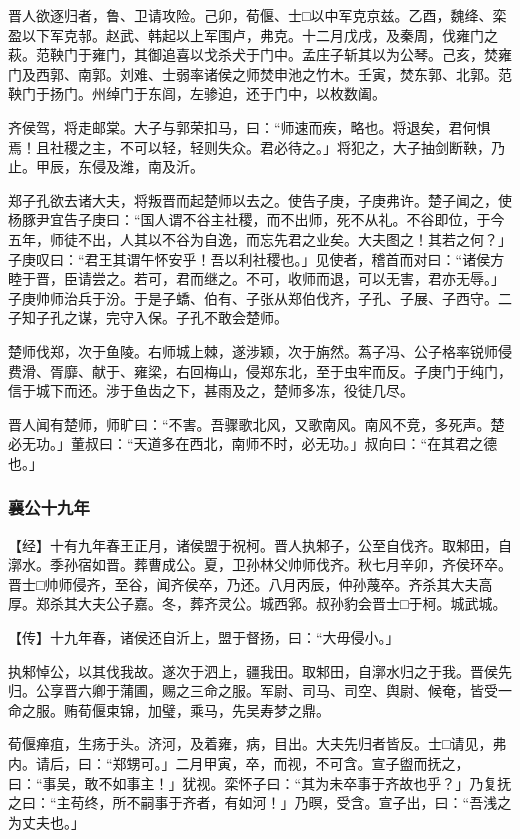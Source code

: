 \documentclass[]{article}
\begin{document}
晋人欲逐归者，鲁、卫请攻险。己卯，荀偃、士□以中军克京兹。乙酉，魏绛、栾盈以下军克邿。赵武、韩起以上军围卢，弗克。十二月戊戌，及秦周，伐雍门之萩。范鞅门于雍门，其御追喜以戈杀犬于门中。孟庄子斩其以为公琴。己亥，焚雍门及西郭、南郭。刘难、士弱率诸侯之师焚申池之竹木。壬寅，焚东郭、北郭。范鞅门于扬门。州绰门于东闾，左骖迫，还于门中，以枚数阖。

齐侯驾，将走邮棠。大子与郭荣扣马，曰：``师速而疾，略也。将退矣，君何惧焉！且社稷之主，不可以轻，轻则失众。君必待之。」将犯之，大子抽剑断鞅，乃止。甲辰，东侵及潍，南及沂。

郑子孔欲去诸大夫，将叛晋而起楚师以去之。使告子庚，子庚弗许。楚子闻之，使杨豚尹宜告子庚曰：``国人谓不谷主社稷，而不出师，死不从礼。不谷即位，于今五年，师徒不出，人其以不谷为自逸，而忘先君之业矣。大夫图之！其若之何？」子庚叹曰：``君王其谓午怀安乎！吾以利社稷也。」见使者，稽首而对曰：``诸侯方睦于晋，臣请尝之。若可，君而继之。不可，收师而退，可以无害，君亦无辱。」子庚帅师治兵于汾。于是子蟜、伯有、子张从郑伯伐齐，子孔、子展、子西守。二子知子孔之谋，完守入保。子孔不敢会楚师。

楚师伐郑，次于鱼陵。右师城上棘，遂涉颖，次于旃然。蒍子冯、公子格率锐师侵费滑、胥靡、献于、雍梁，右回梅山，侵郑东北，至于虫牢而反。子庚门于纯门，信于城下而还。涉于鱼齿之下，甚雨及之，楚师多冻，役徒几尽。

晋人闻有楚师，师旷曰：``不害。吾骤歌北风，又歌南风。南风不竞，多死声。楚必无功。」董叔曰：``天道多在西北，南师不时，必无功。」叔向曰：``在其君之德也。」

\hypertarget{header-n2070}{%
\subsubsection{襄公十九年}\label{header-n2070}}

【经】十有九年春王正月，诸侯盟于祝柯。晋人执邾子，公至自伐齐。取邾田，自漷水。季孙宿如晋。葬曹成公。夏，卫孙林父帅师伐齐。秋七月辛卯，齐侯环卒。晋士□帅师侵齐，至谷，闻齐侯卒，乃还。八月丙辰，仲孙蔑卒。齐杀其大夫高厚。郑杀其大夫公子嘉。冬，葬齐灵公。城西郛。叔孙豹会晋士□于柯。城武城。

【传】十九年春，诸侯还自沂上，盟于督扬，曰：``大毋侵小。」

执邾悼公，以其伐我故。遂次于泗上，疆我田。取邾田，自漷水归之于我。晋侯先归。公享晋六卿于蒲圃，赐之三命之服。军尉、司马、司空、舆尉、候奄，皆受一命之服。贿荀偃束锦，加璧，乘马，先吴寿梦之鼎。

荀偃瘅疽，生疡于头。济河，及着雍，病，目出。大夫先归者皆反。士□请见，弗内。请后，曰：``郑甥可。」二月甲寅，卒，而视，不可含。宣子盥而抚之，曰：``事吴，敢不如事主！」犹视。栾怀子曰：``其为未卒事于齐故也乎？」乃复抚之曰：``主苟终，所不嗣事于齐者，有如河！」乃暝，受含。宣子出，曰：``吾浅之为丈夫也。」
\end{document}
